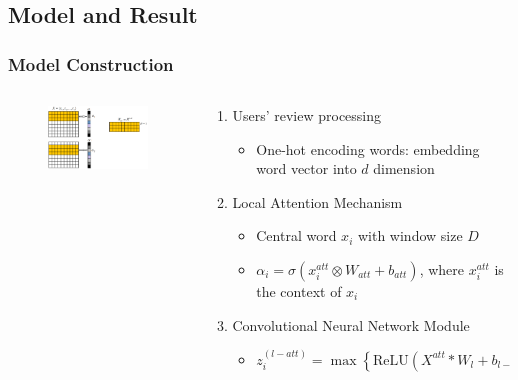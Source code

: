 \documentclass{../presentation}
\begin{document}
    \subsection{Model and Result}
    \begin{frame}
        \frametitle{Model Construction}

        \begin{columns}
            \begin{column}{0.3\linewidth}
                \begin{figure}
                    \centering
                    \includegraphics[width=5cm]{img/gp01-1.png}
                \end{figure}
            \end{column}
            \begin{column}{0.6\linewidth}
                \begin{enumerate}
                    \item Users' review processing
                    \begin{itemize}
                        \small
                        \item One-hot encoding words: embedding word vector into $d$ dimension
                    \end{itemize}
                    \item Local Attention Mechanism
                    \begin{itemize}
                        \item Central word $x_i$ with window size $D$
                        \item $\alpha_i=\sigma\left(x_i^{att}\otimes W_{att}+b_{att}\right)$, where $x_i^{att}$ is the context of $x_i$
                    \end{itemize}
                    \item Convolutional Neural Network Module
                    \begin{itemize}
                        \item $z_i^{(l−att)}=\max\left\{\text{ReLU}(X^{att}\ast W_l+b_{l-att})\right\}$
                    \end{itemize}
                \end{enumerate}
            \end{column}
        \end{columns}

    \end{frame}
\end{document}
